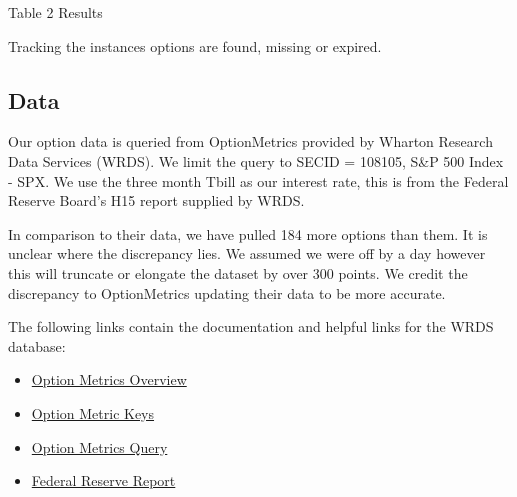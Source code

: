 \thispagestyle{empty}
\begin{landscape}

\begin{table}
    \centering
    \caption{ Table 2 Results}
    
\resizebox{1.4\textwidth}{!}{
\hspace*{-4cm}
  
  }

  \caption*{Tracking the instances options are found, missing or expired.}
\label{tab:t2}
\end{table}
\vfill
\raisebox{-6.5cm}{\makebox[\linewidth]{\thepage}}
\end{landscape}
\newpage


\begin{appendix}


\section{Data}\label{app:data}

Our option data is queried from OptionMetrics provided by Wharton Research Data Services (WRDS). We limit the query to SECID = 108105, S\&P 500 Index - SPX. We use the three month Tbill as our interest rate, this is from the Federal Reserve Board's H15 report supplied by WRDS. 

In comparison to their data, we have pulled 184 more options than them. It is unclear where the discrepancy lies. We assumed we were off by a day however this will truncate or elongate the dataset by over 300 points. We credit the discrepancy to OptionMetrics updating their data to be more accurate. 

The following links contain the documentation and helpful links for the WRDS database: 
\begin{itemize}
\item \href{https://wrds-www.wharton.upenn.edu/pages/support/manuals-and-overviews/optionmetrics/wrds-overview-optionmetrics/}{Option Metrics Overview} 
\item \href{https://wrds-www.wharton.upenn.edu/data-dictionary/optionm_all/opprcd2023/ }{Option Metric Keys}
\item \href{https://wrds-www.wharton.upenn.edu/pages/get-data/optionmetrics/ivy-db-us/options/option-prices/}{Option Metrics Query} 
\item \href{https://wrds-www.wharton.upenn.edu/data-dictionary/frb_all/rates_daily/}{Federal Reserve Report} 
\end{itemize}




\end{appendix}
